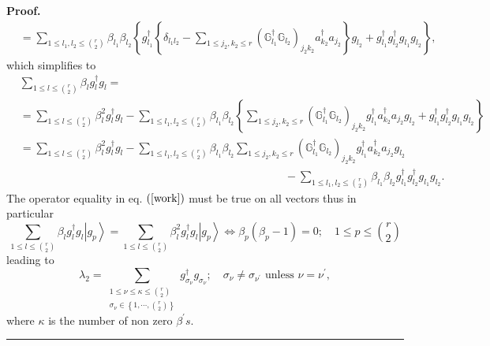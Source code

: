 \documentclass[aps,preprint]{revtex4}%
\newenvironment{proof}[1][Proof]{\noindent\textbf{#1.} }{\ \rule{0.5em}{0.5em}}
\begin{document}
\begin{proof}
\begin{align}
&  =\sum_{1\leq l_{1},l_{2}\leq\binom{r}{2}}\beta_{l_{1}}\beta_{l_{2}}\left\{
g_{l_{1}}^{\dagger}\left\{  \delta_{l_{1}l_{2}}-\sum_{1\leq j_{2},k_{2}\leq
r}\left(  \mathbb{G}_{l_{1}}^{\dagger}\mathbb{G}_{l_{2}}\right)  _{j_{2}k_{2}%
}a_{k_{2}}^{\dagger}a_{j_{2}}\right\}  g_{l_{2}}+g_{l_{1}}^{\dagger}g_{l_{2}%
}^{\dagger}g_{l_{1}}g_{l_{2}}\right\}  ,
\end{align}
which simplifies to%
\begin{align}
&  \sum_{1\leq l\leq\binom{r}{2}}\beta_{l}g_{l}^{\dagger}g_{l}=\nonumber\\
&  =\sum_{1\leq l\leq\binom{r}{2}}\beta_{l}^{2}g_{l}^{\dagger}g_{l}%
-\sum_{1\leq l_{1},l_{2}\leq\binom{r}{2}}\beta_{l_{1}}\beta_{l_{2}}\left\{
\sum_{1\leq j_{2},k_{2}\leq r}\left(  \mathbb{G}_{l_{1}}^{\dagger}%
\mathbb{G}_{l_{2}}\right)  _{j_{2}k_{2}}g_{l_{1}}^{\dagger}a_{k_{2}}^{\dagger
}a_{j_{2}}g_{l_{2}}+g_{l_{1}}^{\dagger}g_{l_{2}}^{\dagger}g_{l_{1}}g_{l_{2}%
}\right\} \nonumber\\
&  =\sum_{1\leq l\leq\binom{r}{2}}\beta_{l}^{2}g_{l}^{\dagger}g_{l}%
-\sum_{1\leq l_{1},l_{2}\leq\binom{r}{2}}\beta_{l_{1}}\beta_{l_{2}}\sum_{1\leq
j_{2},k_{2}\leq r}\left(  \mathbb{G}_{l_{1}}^{\dagger}\mathbb{G}_{l_{2}%
}\right)  _{j_{2}k_{2}}g_{l_{1}}^{\dagger}a_{k_{2}}^{\dagger}a_{j_{2}}%
g_{l_{2}}\nonumber\\
&  \qquad\qquad\qquad\qquad\qquad\qquad\qquad\qquad\qquad\qquad\qquad
\qquad-\sum_{1\leq l_{1},l_{2}\leq\binom{r}{2}}\beta_{l_{1}}\beta_{l_{2}%
}g_{l_{1}}^{\dagger}g_{l_{2}}^{\dagger}g_{l_{1}}g_{l_{2}}. \label{work}%
\end{align}
The operator equality in eq. $\left(  \ref{work}\right)  $ must be true on all
vectors thus in particular
\begin{equation}
\sum_{1\leq l\leq\binom{r}{2}}\beta_{l}g_{l}^{\dagger}g_{l}\left\vert
g_{p}\right\rangle =\sum_{1\leq l\leq\binom{r}{2}}\beta_{l}^{2}g_{l}^{\dagger
}g_{l}\left\vert g_{p}\right\rangle \Longleftrightarrow\beta_{p}\left(
\beta_{p}-1\right)  =0;\quad1\leq p\leq\binom{r}{2}%
\end{equation}
leading to
\begin{equation}
\lambda_{2}=\sum_{\substack{1\leq\nu\leq\kappa\leq\binom{r}{2}\\\sigma_{\nu
}\in\left\{  1,\cdots,\binom{r}{2}\right\}  }}g_{\sigma_{\nu}}^{\dagger
}g_{\sigma_{\nu}};\quad\sigma_{\nu}\neq\sigma_{\nu^{\prime}}\text{ unless }%
\nu=\nu^{\prime},
\end{equation}
where $\kappa$ is the number of non zero $\beta^{\prime}s.$
\end{proof}
\end{document}
